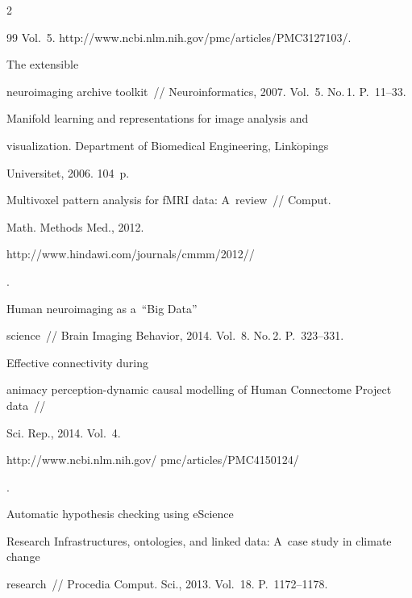 \begin{multicols}{2}
{{\begin{thebibliography}{99}
Vol.~5. {\sf http://www.ncbi.nlm.nih.gov/pmc/\linebreak articles/PMC3127103/}.




 The extensible


neuroimaging archive toolkit~// Neuroinformatics, 2007. Vol.~5. No.\,1. P.~11--33.




 Manifold learning and representations for image analysis and


visualization. Department of Biomedical Engineering, Link$\ddot{\mbox{o}}$pings


Universitet, 2006. 104~p.






Multivoxel pattern analysis for fMRI data: A~review~// Comput.


Math. Methods Med., 2012.


{\sf


http://www.hindawi.com/journals/cmmm/2012//}.




 Human neuroimaging as a~``Big Data''


science~// Brain Imaging Behavior, 2014.  Vol.~8. No.\,2.  P.~323--331.




 Effective connectivity during


animacy perception-dynamic causal modelling of Human Connectome Project data~//


Sci. Rep., 2014.  Vol.~4. {\sf


http://www.ncbi.nlm.nih.gov/ pmc/articles/PMC4150124/}.




 Automatic hypothesis checking using eScience


Research Infrastructures, ontologies, and linked data: A~case study in climate change


research~// Procedia Comput. Sci., 2013. Vol.~18. P.~1172--1178.



\end{thebibliography}}}
\end{multicols}
